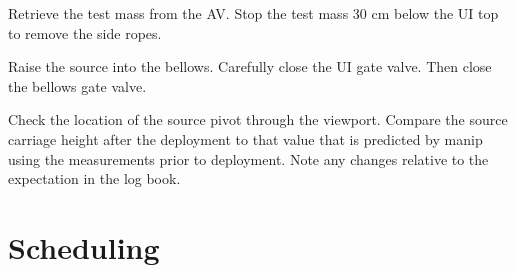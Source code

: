 \documentclass[11pt]{article}
\begin{document}
\begin{answerlist}
\item Retrieve the test mass from the AV. Stop the test mass 30 cm below the UI top to remove the side ropes.
\item Raise the source into the bellows. Carefully close the UI gate valve. Then close the bellows gate valve.
\item Check the location of the source pivot through the viewport. Compare the source carriage height after the deployment to that value that is predicted by manip using the measurements prior to deployment. Note any changes relative to the expectation in the log book.
\end{answerlist}

\section{Scheduling}
\end{document}
